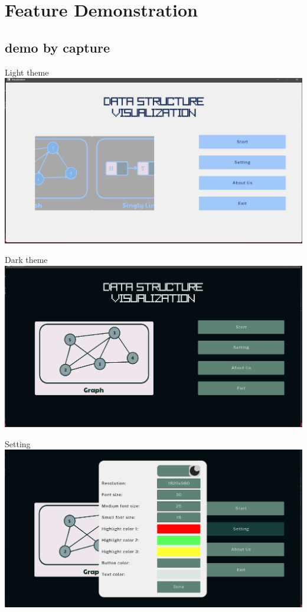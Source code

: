 \section{Feature Demonstration}
\subsection{demo by capture}
\begin{center}
    Light theme \includegraphics[scale=.35]{img/start_light.png} 
    
    Dark theme \includegraphics[scale=.35]{img/start_dark.png}  
    
    Setting \includegraphics[scale=.35]{img/setting.png}
    

\end{center}

